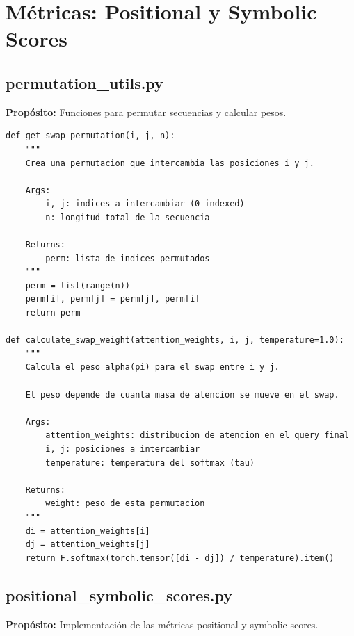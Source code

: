 \documentclass[12pt,a4paper]{report}
\begin{document}
\section{Métricas: Positional y Symbolic Scores}
\label{sec:metricas}

\subsection{permutation\_utils.py}
\label{subsec:permutation_utils}

\textbf{Propósito:} Funciones para permutar secuencias y calcular pesos.

\begin{lstlisting}
def get_swap_permutation(i, j, n):
    """
    Crea una permutacion que intercambia las posiciones i y j.
    
    Args:
        i, j: indices a intercambiar (0-indexed)
        n: longitud total de la secuencia
    
    Returns:
        perm: lista de indices permutados
    """
    perm = list(range(n))
    perm[i], perm[j] = perm[j], perm[i]
    return perm

def calculate_swap_weight(attention_weights, i, j, temperature=1.0):
    """
    Calcula el peso alpha(pi) para el swap entre i y j.
    
    El peso depende de cuanta masa de atencion se mueve en el swap.
    
    Args:
        attention_weights: distribucion de atencion en el query final
        i, j: posiciones a intercambiar
        temperature: temperatura del softmax (tau)
    
    Returns:
        weight: peso de esta permutacion
    """
    di = attention_weights[i]
    dj = attention_weights[j]
    return F.softmax(torch.tensor([di - dj]) / temperature).item()
\end{lstlisting}

\subsection{positional\_symbolic\_scores.py}
\label{subsec:positional_symbolic_scores}

\textbf{Propósito:} Implementación de las métricas positional y symbolic scores.
\end{document}
